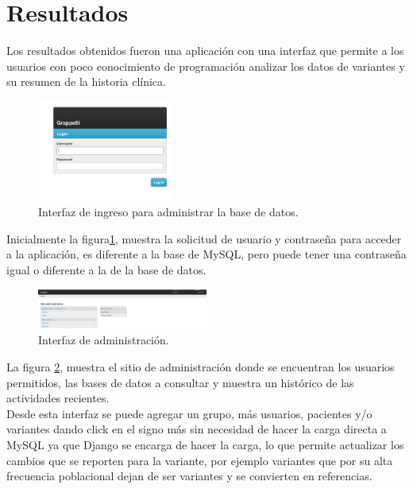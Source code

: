 \section{Resultados} 

Los resultados obtenidos fueron una aplicación con una interfaz que permite a los usuarios con poco conocimiento de  programación  analizar los datos de variantes y su resumen de la historia clínica. \\

\begin{figure}[h] 
	\centering
	\includegraphics[width=0.4\textwidth]{Kap3/admin_django}
	\caption{Interfaz de ingreso para  administrar la base de datos.} \label{fig:admin}
\end{figure}

Inicialmente la figura\ref{fig:admin}, muestra la solicitud de usuario y contraseña para acceder a la aplicación, es diferente a la base de MySQL, pero  puede tener  una contraseña igual o diferente a la de la base de datos.

\begin{figure}[h] 
	\centering
	\includegraphics[width=0.5\textwidth]{Kap3/django_admin}
	\caption{Interfaz de administración.} \label{fig:admin2}
\end{figure}

La figura \ref{fig:admin2}, muestra el sitio de administración donde se encuentran los usuarios permitidos, las bases de datos a consultar y muestra un histórico de las actividades recientes. \\

Desde esta interfaz se puede agregar un grupo, más usuarios, pacientes y/o variantes dando click en el signo más sin necesidad de hacer la carga directa a MySQL ya que Django se encarga de hacer la carga, lo que permite actualizar los cambios que se reporten para la variante, por ejemplo variantes que por su alta frecuencia poblacional dejan de ser variantes y se convierten en referencias. \\

